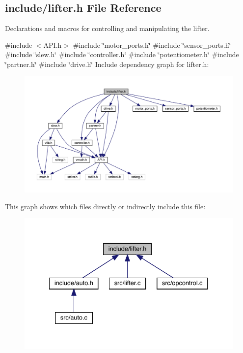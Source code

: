 \subsection{include/lifter.h File Reference}
\label{lifter_8h}


Declarations and macros for controlling and manipulating the lifter.  


{\ttfamily \#include $<$A\+P\+I.\+h$>$}\newline
{\ttfamily \#include \char`\"{}motor\+\_\+ports.\+h\char`\"{}}\newline
{\ttfamily \#include \char`\"{}sensor\+\_\+ports.\+h\char`\"{}}\newline
{\ttfamily \#include \char`\"{}slew.\+h\char`\"{}}\newline
{\ttfamily \#include \char`\"{}controller.\+h\char`\"{}}\newline
{\ttfamily \#include \char`\"{}potentiometer.\+h\char`\"{}}\newline
{\ttfamily \#include \char`\"{}partner.\+h\char`\"{}}\newline
{\ttfamily \#include \char`\"{}drive.\+h\char`\"{}}\newline
Include dependency graph for lifter.\+h\+:\nopagebreak
\begin{figure}[H]
\begin{center}
\leavevmode
\includegraphics[width=350pt]{lifter_8h__incl}
\end{center}
\end{figure}
This graph shows which files directly or indirectly include this file\+:\nopagebreak
\begin{figure}[H]
\begin{center}
\leavevmode
\includegraphics[width=334pt]{lifter_8h__dep__incl}
\end{center}
\end{figure}
